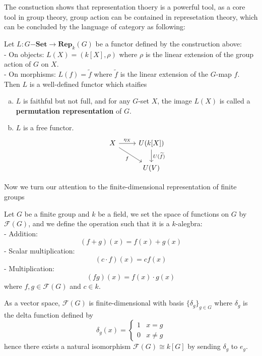 The constuction shows that representation thoery is a powerful tool, as a core tool in group theory, group action can be contained in represetation theory, which can be concluded by the language of category as following:
\begin{colorproposition}
    Let \(L:G \mathbf{-Set} \to \mathbf{Rep}_k(G)\) be a functor defined by the construction above:\\
    - On objects: \(L(X) = (k[X],\rho)\) where \(\rho\) is the linear extension of the group action of \(G\) on \(X\).\\
    - On morphisms: \(L(f) = \tilde{f}\) where \(\tilde{f}\) is the linear extension of the \(G\)-map \(f\).\\
    Then \(L\) is a well-defined functor which staifies
    \begin{enumerate} [(a)]
        \item \(L\) is faithful but not full, and for any \(G\)-set \(X\), the image \(L(X)\) is called a \textbf{permutation representation} of \(G\).
        \item \(L\) is a free functor.
         \[
\begin{tikzcd}
X \arrow[r, "\eta_X"] \arrow[dr, "f"'] 
& U(k[X]) \arrow[d, "U(\widetilde{f})"] \\
& U(V)
\end{tikzcd}
\]
    \end{enumerate}

\end{colorproposition}


Now we turn our attention to the finite-dimensional representation of finite groups  


\begin{definition}
    Let \(G\) be a finite group and \(k\) be a field, we set the space of functions on \(G\) by \(\mathcal{F}(G)\), and we define the operation such that it is a \(k\)-alegbra:\\
    - Addition:
    \[(f+g)(x) = f(x) + g(x)\]
    - Scalar multiplication:
    \[(c\cdot f)(x) = cf(x)\]
    - Multiplication:
\[(fg)(x) = f(x) \cdot g(x)\]
    where \(f,g \in \mathcal{F}(G)\) and \(c \in k\).
\end{definition}

As a vector space, \(\mathcal{F}(G)\) is finite-dimensional with basis \(\{\delta_g\}_{g \in G}\) where \(\delta_g\) is the delta function defined by
\[\delta_g(x) = \begin{cases} 1 & x = g\\ 0 & x \neq g\end{cases}\]
hence there exists a natural isomorphism \(\mathcal{F}(G) \cong k[G]\) by sending \(\delta_g\) to \(e_g\).

